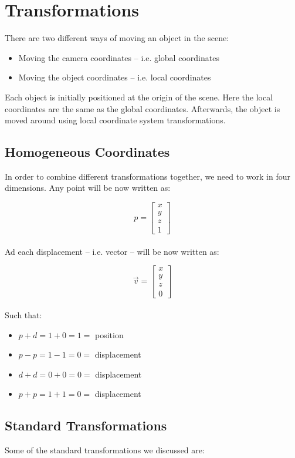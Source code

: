 \documentclass{article}
\begin{document}
\section{Transformations}
There are two different ways of moving an object in the scene:

\begin{itemize}
	\item Moving the camera coordinates -- i.e. global coordinates
	\item Moving the object coordinates -- i.e. local coordinates
\end{itemize}
Each object is initially positioned at the origin of the scene. Here the local coordinates are the same as the global coordinates. Afterwards, the object is moved around using local coordinate system transformations.

\subsection{Homogeneous Coordinates}
In order to combine different transformations together, we need to work in four dimensions. Any point will be now written as:

\[ p = \begin{bmatrix} x \\ y \\ z \\ 1 \end{bmatrix} \] \\
Ad each displacement -- i.e. vector -- will be now written as:

\[ \overrightarrow{v} = \begin{bmatrix} x \\ y \\ z \\ 0 \end{bmatrix} \] \\
Such that:

\begin{itemize}
	\item $p + d = 1 + 0 = 1 =$ position
	\item $p - p = 1 - 1 = 0 =$ displacement
	\item $d + d = 0 + 0 = 0 =$ displacement
	\item $p + p = 1 + 1 = 0 =$ displacement
\end{itemize}

\subsection{Standard Transformations}
Some of the standard transformations we discussed are:
\end{document}
